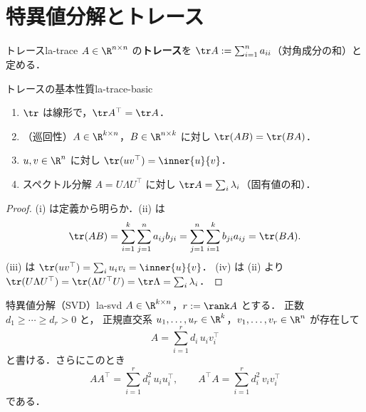 \section{特異値分解とトレース}

\begin{definition}{トレース}{la-trace}
  $A\in\R^{n\times n}$ の\textbf{トレース}を
  $\tr A:=\sum_{i=1}^na_{ii}$（対角成分の和）と定める．
\end{definition}

\begin{claim}{トレースの基本性質}{la-trace-basic}
  \begin{enumerate}
    \item $\tr$ は線形で，$\tr A^\top=\tr A$．
    \item （巡回性）$A\in\R^{k\times n}$，$B\in\R^{n\times k}$ に対し
      $\tr(AB)=\tr(BA)$．
    \item $u,v\in\R^n$ に対し $\tr(uv^\top)=\inner{u}{v}$．
    \item スペクトル分解 $A=U\Lambda U^\top$ に対し
      $\tr A=\sum_i\lambda_i$（固有値の和）．
  \end{enumerate}
\end{claim}

\begin{proof}
  (i) は定義から明らか．(ii) は
  \[
    \tr(AB)=\sum_{i=1}^k\sum_{j=1}^na_{ij}b_{ji}
    =\sum_{j=1}^n\sum_{i=1}^kb_{ji}a_{ij}=\tr(BA).
  \]
  (iii) は $\tr(uv^\top)=\sum_iu_iv_i=\inner{u}{v}$．
  (iv) は (ii) より
  $\tr(U\Lambda U^\top)=\tr(\Lambda U^\top U)=\tr\Lambda=\sum_i\lambda_i$．
\end{proof}

\begin{lemma}{特異値分解（SVD）}{la-svd}
  $A\in\R^{k\times n}$，$r:=\rank A$ とする．
  正数 $d_1\geq\cdots\geq d_r>0$ と，
  正規直交系 $u_1,\dots,u_r\in\R^k$，$v_1,\dots,v_r\in\R^n$ が存在して
  \[
    A=\sum_{i=1}^rd_i\,u_iv_i^\top
  \]
  と書ける．さらにこのとき
  \[
    AA^\top=\sum_{i=1}^rd_i^2\,u_iu_i^\top,
    \qquad
    A^\top A=\sum_{i=1}^rd_i^2\,v_iv_i^\top
  \]
  である．
\end{lemma}

